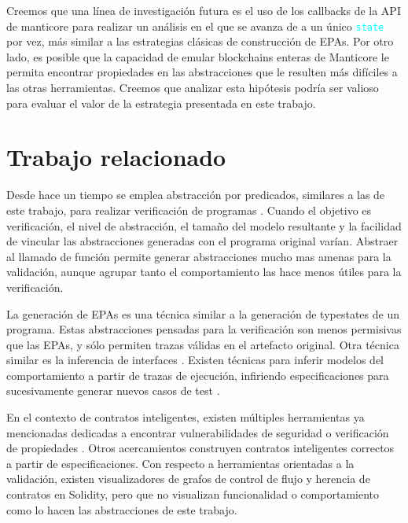 Creemos que una línea de investigación futura es el uso de los callbacks de la API de manticore para realizar un análisis en el que se avanza de a un único \textcolor{cyan}{\texttt{state}} por vez, más similar a las estrategias clásicas de construcción de EPAs.
Por otro lado, es posible que la capacidad de emular blockchains enteras de Manticore le permita encontrar propiedades en las abstracciones que le resulten más difíciles a las otras herramientas.
Creemos que analizar esta hipótesis podría ser valioso para evaluar el valor de la estrategia presentada en este trabajo.

\section{Trabajo relacionado}
Desde hace un tiempo se emplea abstracción por predicados, similares a las de este trabajo, para realizar verificación de programas \cite{predicate-abstraction-for-verification}.
Cuando el objetivo es verificación, el nivel de abstracción, el tamaño del modelo resultante y la facilidad de vincular las abstracciones generadas con el programa original varían.
Abstraer al llamado de función permite generar abstracciones mucho mas amenas para la validación, aunque agrupar tanto el comportamiento las hace menos útiles para la verificación.

La generación de EPAs es una técnica similar a la generación de typestates \cite{high-level-protocols-for-low-level-software} de un programa.
Estas abstracciones pensadas para la verificación son menos permisivas que las EPAs, y sólo permiten trazas válidas en el artefacto original.
Otra técnica similar es la inferencia de interfaces \cite{permissive-interfaces}.
Existen técnicas para inferir modelos del comportamiento a partir de trazas de ejecución, infiriendo especificaciones para sucesivamente generar nuevos casos de test \cite{inference-by-traces}.

En el contexto de contratos inteligentes, existen múltiples herramientas ya mencionadas dedicadas a encontrar vulnerabilidades de seguridad \cite{oyente} \cite{echidna} \cite{manticore} \cite{pakala} \cite{teether} o verificación de propiedades \cite{solidity-to-CPN} \cite{formal-analysis-based-on-CPN} \cite{verisol}.
Otros acercamientos \cite{VeriSolid} construyen contratos inteligentes correctos a partir de especificaciones.
Con respecto a herramientas orientadas a la validación, existen visualizadores \cite{surya} \cite{slither} de grafos de control de flujo y herencia de contratos en Solidity, pero que no visualizan funcionalidad o comportamiento como lo hacen las abstracciones de este trabajo.


